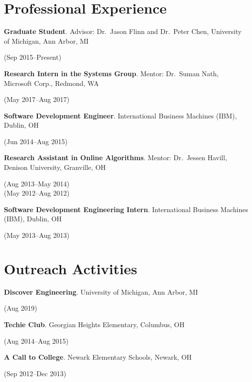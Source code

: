 \documentclass[letterpaper,10pt]{article}
\newcommand{\sidebyside}[2]{
  \begin{minipage}[t]{.75\textwidth}
    \raggedright{}
    #2
  \end{minipage}
  \hspace{.01\textwidth}
    \begin{minipage}[t]{.205\textwidth}
    \raggedleft
    #1
  \end{minipage}
}
\newcommand{\trio}[3]{\sidebyside{#3}{\textbf{#1}. #2}}
\begin{document}
\section{Professional Experience}
\begin{smenumerate}
\item\trio{Graduate Student}{Advisor: Dr.\ Jason Flinn and Dr.\ Peter Chen,
  University of Michigan, Ann Arbor, MI}{(Sep 2015--Present)}

\item\trio{Research Intern in the Systems Group}{Mentor: Dr.\ Suman Nath,
  Microsoft Corp., Redmond, WA}{(May 2017--Aug 2017)}

\item\trio{Software Development Engineer}{International Business Machines (IBM),
  Dublin, OH}{(Jun 2014--Aug 2015)}

\item\trio{Research Assistant in Online Algorithms}{Mentor: Dr.\ Jessen Havill,
  Denison University, Granville, OH}{(Aug 2013--May 2014)\\(May 2012--Aug 2012)}

\item\trio{Software Development Engineering Intern}{International Business
  Machines (IBM), Dublin, OH}{(May 2013--Aug 2013)}

\end{smenumerate}

\section{Outreach Activities}
\begin{smenumerate}
\item\trio{Discover Engineering}{University of Michigan, Ann Arbor, MI}{(Aug 2019)}
\item\trio{Techie Club}{Georgian Heights Elementary, Columbus, OH}{(Aug 2014--Aug 2015)}
\item\trio{A Call to College}{Newark Elementary Schools, Newark, OH}{(Sep 2012--Dec 2013)}
\end{smenumerate}
\end{document}
